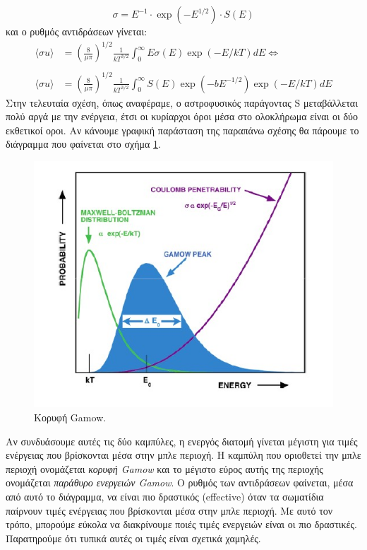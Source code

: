 \begin{equation}
\label{eq57}
\sigma = E^{-1}\cdot \exp (-E^{1/2})\cdot S(E)
\end{equation} 
και ο ρυθμός αντιδράσεων γίνεται:
\begin{align}
\label{eq58_59}
\nonumber\langle \sigma u \rangle &= \left(  \frac{8}{\mu \pi} \right)^{1/2} \frac{1}{kT^{3/2}} \int_{0}^{\infty} E \sigma(E) \exp (-E/kT)dE \Longleftrightarrow \\ \nonumber \\
\langle \sigma u \rangle &=\left(  \frac{8}{\mu \pi} \right)^{1/2} \frac{1}{kT^{3/2}} \int_{0}^{\infty} S(E) \exp (-bE^{-1/2})\exp(-E/kT)dE
\end{align}
Στην τελευταία σχέση, όπως αναφέραμε, ο αστροφυσικός παράγοντας S μεταβάλλεται πολύ αργά με την ενέργεια, έτσι οι κυρίαρχοι όροι μέσα στο ολοκλήρωμα είναι οι δύο εκθετικοί οροι. Αν κάνουμε γραφική παράσταση της παραπάνω σχέσης θα πάρουμε το διάγραμμα που φαίνεται στο σχήμα \ref{fig:apx:gamow}.
\begin{figure}[h!]
    \centering
    \includegraphics[scale=0.7]{Figures/gamow.jpg} 
     \caption{Κορυφή Gamow.}
     \label{fig:apx:gamow}
\end{figure}
Aν συνδυάσουμε αυτές τις δύο καμπύλες, η ενεργός διατομή γίνεται μέγιστη για τιμές ενέργειας που βρίσκονται μέσα στην μπλε περιοχή. Η καμπύλη που οριοθετεί την μπλε περιοχή ονομάζεται \textit{κορυφή Gamow} και το μέγιστο εύρος αυτής της περιοχής ονομάζεται \textit{παράθυρο ενεργειών Gamow}. Ο ρυθμός των αντιδράσεων φαίνεται, μέσα από αυτό το διάγραμμα, να είναι πιο δραστικός (effective) όταν τα σωματίδια παίρνουν τιμές ενέργειας που βρίσκονται μέσα στην μπλε περιοχή. Με αυτό τον τρόπο, μπορούμε εύκολα να διακρίνουμε ποιές τιμές ενεργειών είναι οι πιο δραστικές. Παρατηρούμε ότι τυπικά αυτές οι τιμές είναι σχετικά χαμηλές.

